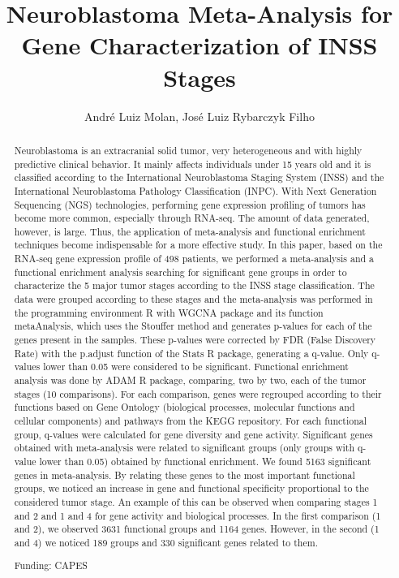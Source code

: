 \documentclass[twoside]{article}
\title{\vspace{-15mm}\fontsize{24pt}{10pt}\selectfont\textbf{ Neuroblastoma Meta-Analysis for Gene Characterization of INSS Stages }} %
\author{ Andr\'e Luiz Molan, Jos\'e Luiz Rybarczyk Filho }
\affil{ Instituto de Bioci\^encias de Botucatu - UNESP }
\date{}
\begin{document}
  
  
  \maketitle %
  
  
  \thispagestyle{fancy} %
  
  
  \begin{abstract}
  Neuroblastoma is an extracranial solid tumor,  very heterogeneous and with highly predictive clinical behavior. It mainly affects individuals under 15 years old and it is classified according to the International Neuroblastoma Staging System (INSS) and the International Neuroblastoma Pathology Classification (INPC). With Next Generation Sequencing (NGS) technologies,  performing gene expression profiling of tumors has become more common,  especially through RNA-seq. The amount of data generated,  however,  is large. Thus,  the application of meta-analysis and functional enrichment techniques become indispensable for a more effective study. In this paper,  based on the RNA-seq gene expression profile of 498 patients,  we performed a meta-analysis and a functional enrichment analysis searching for significant gene groups in order to characterize the 5 major tumor stages according to the INSS stage classification. The data were grouped according to these stages and the meta-analysis was performed in the programming environment R with WGCNA package and its function metaAnalysis,  which uses the Stouffer method and generates p-values for each of the genes present in the samples. These p-values were corrected by FDR (False Discovery Rate) with the p.adjust function of the Stats R package,  generating a q-value. Only q-values lower than 0.05 were considered to be significant. Functional enrichment analysis was done by ADAM R package,  comparing,  two by two,  each of the tumor stages (10 comparisons). For each comparison,  genes were regrouped according to their functions based on Gene Ontology (biological processes,  molecular functions and cellular components) and pathways from the KEGG repository. For each functional group,  q-values were calculated for gene diversity and gene activity. Significant genes obtained with meta-analysis were related to significant groups (only groups with q-value lower than 0.05) obtained by functional enrichment. We found 5163 significant genes in meta-analysis. By relating these genes to the most important functional groups,  we noticed an increase in gene and functional specificity proportional to the considered tumor stage. An example of this can be observed when comparing stages 1 and 2 and 1 and 4 for gene activity and biological processes. In the first comparison (1 and 2),  we observed 3631 functional groups and 1164 genes. However,  in the second (1 and 4) we noticed 189 groups and 330 significant genes related to them.
  
  Funding: CAPES \\ 
  \end{abstract}
  
\end{document}
